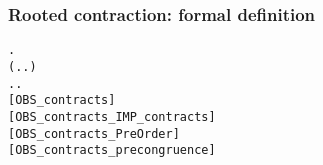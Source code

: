 \begin{frame}[fragile]
\frametitle{Rooted contraction: formal definition}
\begin{small}
\begin{alltt}
\HOLTokenTurnstile{}  \HOLSymConst{\HOLTokenObsContracts}  \HOLSymConst{\HOLTokenEquiv{}}
   \HOLSymConst{\HOLTokenForall{}}.
       (\HOLSymConst{\HOLTokenForall{}}.  \HOLTokenTransBegin{}\HOLTokenTransEnd {} \HOLSymConst{\HOLTokenImp{}} \HOLSymConst{\HOLTokenExists{}}.  \HOLTokenTransBegin{}\HOLTokenTransEnd {} \HOLSymConst{\HOLTokenConj{}}  \HOLSymConst{\HOLTokenContracts{}} ) \HOLSymConst{\HOLTokenConj{}}
       \HOLSymConst{\HOLTokenForall{}}.  \HOLTokenTransBegin{}\HOLTokenTransEnd {} \HOLSymConst{\HOLTokenImp{}} \HOLSymConst{\HOLTokenExists{}}.  \HOLTokenWeakTransBegin{}\HOLTokenWeakTransEnd {} \HOLSymConst{\HOLTokenConj{}}  \HOLSymConst{\HOLTokenWeakEQ} 
\hfill{[OBS_contracts]}
\HOLTokenTurnstile{}  \HOLSymConst{\HOLTokenObsContracts}  \HOLSymConst{\HOLTokenImp{}}  \HOLSymConst{\HOLTokenContracts{}} \hfill{[OBS_contracts_IMP_contracts]}
\HOLTokenTurnstile{}  \hfill{[OBS_contracts_PreOrder]}
\HOLTokenTurnstile{}  \hfill{[OBS_contracts_precongruence]}
\end{alltt}


\end{small}
\end{frame}
